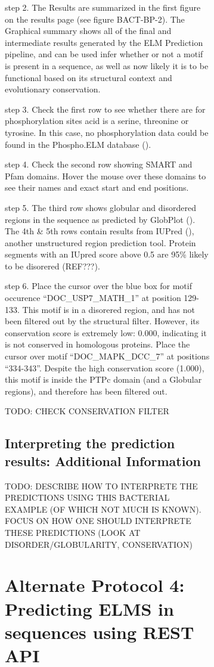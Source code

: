 {\begin{figure}[h!]
{{\begin{figure}[h!]
{{step 2. The Results are summarized in the first figure on the results
page (see figure BACT-BP-2). The Graphical summary shows all of the
final and intermediate results generated by the ELM Prediction pipeline,
and can be used infer whether or not a motif is present in a sequence,
as well as now likely it is to be functional based on its structural
context and evolutionary conservation.

step 3. Check the first row to see whether there are for phosphorylation
sites acid is a serine, threonine or tyrosine. In this case, no
phosphorylation data could be found in the Phospho.ELM database
(\cite{21062810}).

step 4. Check the second row showing SMART and Pfam domains. Hover the
mouse over these domains to see their names and exact start and end
positions.

step 5. The third row shows globular and disordered regions in the
sequence as predicted by GlobPlot (\cite{12824398}). The 4th \& 5th rows
contain results from IUPred (\cite{15955779}), another unstructured
region prediction tool. Protein segments with an IUpred score above 0.5
are 95\% likely to be disorered (REF???).

step 6. Place the cursor over the blue box for motif occurence
``DOC\_USP7\_MATH\_1'' at position 129-133. This motif is in a disorered
region, and has not been filtered out by the structural filter. However,
its conservation score is extremely low: 0.000, indicating it is not
conserved in homologous proteins. Place the cursor over motif
``DOC\_MAPK\_DCC\_7'' at positions ``334-343''. Despite the high
conservation score (1.000), this motif is inside the PTPc domain (and a
Globular regions), and therefore has been filtered out.

TODO: CHECK CONSERVATION FILTER

\subsection{Interpreting the prediction results: Additional
Information}\label{interpreting-the-prediction-results-additional-information}

TODO: DESCRIBE HOW TO INTERPRETE THE PREDICTIONS USING THIS BACTERIAL
EXAMPLE (OF WHICH NOT MUCH IS KNOWN). FOCUS ON HOW ONE SHOULD INTERPRETE
THESE PREDICTIONS (LOOK AT DISORDER/GLOBULARITY, CONSERVATION)

\section{Alternate Protocol 4: Predicting ELMS in sequences using REST
API}\label{alternate-protocol-4-predicting-elms-in-sequences-using-rest-api}

}}
\end{figure}}}
\end{figure}}
